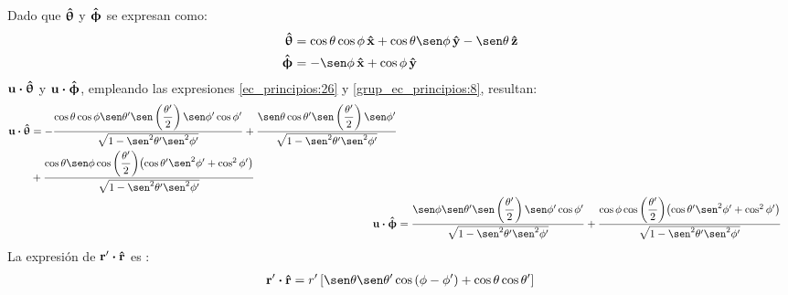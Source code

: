 Dado que $\bm{\mathbf{\hat{\uptheta}}}$ y $\bm{\mathbf{\hat{\upphi}}}$ se expresan como:
\begin{subequations}
\label{grup_ec_principios:8}
\begin{align}
\versor{\uptheta} &= \cos\theta\cos\phi\,\versor{x} + \cos\theta\sen\phi\,\versor{y} - \sen\theta\,\versor{z}
\label{ec_principios:43}\\
\versor{\upphi} &= -\sen\phi\,\versor{x} + \cos\phi\,\versor{y}
\label{ec_principios:44}
\end{align}
\end{subequations}
$\mathbf{u}\boldsymbol{\cdot}\bm{\mathbf{\hat{\uptheta}}}$ y $\mathbf{u}\boldsymbol{\cdot}\bm{\mathbf{\hat{\upphi}}}$, empleando las expresiones \eqref{ec_principios:26} y \eqref{grup_ec_principios:8}, resultan:
\begin{subequations}
\label{grup_ec_principios:9}
\begin{align}
\begin{split}
\mathbf{u}\prodesc\versor{\uptheta} &= -\dfrac{\cos\theta\cos\phi\sen\theta '\sen\left(\dfrac{\theta '}{2}\right)\sen\phi '\cos\phi '}{\sqrt{1 - \sen^2\theta '\sen^2\phi '}} + \dfrac{\sen\theta\cos\theta '\sen\left(\dfrac{\theta '}{2}\right)\sen\phi '}{\sqrt{1 - \sen^2\theta '\sen^2\phi '}}\\
&+ \dfrac{\cos\theta\sen\phi\cos\left(\dfrac{\theta '}{2}\right)\!\left(\cos\theta '\sen^2\phi ' + \cos^2\phi '\right)}{\sqrt{1 - \sen^2\theta '\sen^2\phi '}}
\label{ec_principios:45}
\end{split}\\
\mathbf{u}\prodesc\versor{\upphi} &= \dfrac{\sen\phi\sen\theta '\sen\left(\dfrac{\theta '}{2}\right)\sen\phi '\cos\phi '}{\sqrt{1 - \sen^2\theta '\sen^2\phi '}} + \dfrac{\cos\phi\cos\left(\dfrac{\theta '}{2}\right)\!\left(\cos\theta '\sen^2\phi ' + \cos^2\phi '\right)}{\sqrt{1 - \sen^2\theta '\sen^2\phi '}}
\label{ec_principios:46}
\end{align}
\end{subequations}
La expresión de $\mathbf{r}'\boldsymbol{\cdot}\bm{\mathbf{\hat{r}}}$ es \cite{Balanisantenas}:
\begin{align}
\mathbf{r}'\prodesc\versor{r} = r'\left[\sen\theta\sen\theta '\cos\left(\phi - \phi '\right) + \cos\theta\cos\theta '\right]
\label{ec_principios:47}
\end{align}

